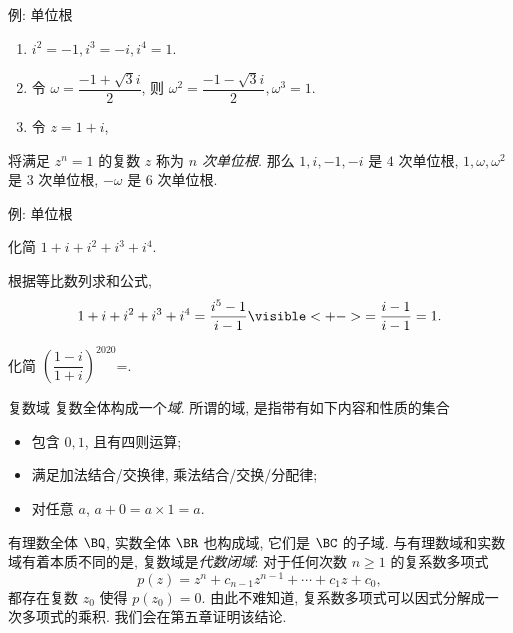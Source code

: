 \begin{frame}{例: 单位根}
	\onslide<+->
	\begin{example}
		\begin{enumerate}
			\item $i^2=-1,i^3=-i,i^4=1$.
			\onslide<+->{%
				一般地, 对于整数 $n$, 
				\[i^{4n}=1,\quad i^{4n+1}=i,\quad i^{4n+2}=-1,\quad i^{4n+3}=-i.\]
			}
			\vspace{-\baselineskip}
			\item 令 $\omega=\dfrac{-1+\sqrt 3i}2$, 则 $\omega^2=\dfrac{-1-\sqrt3i}2,\omega^3=1$.
			\item 令 $z=1+i$, \onslide<+->{则
			\[z^2=2i,\quad z^3=-2+2i,\quad z^4=-4,\quad z^8=16=2^4.\]}
		\end{enumerate}
		\vspace{-\baselineskip}
	\end{example}
	\onslide<+->
	将满足 $z^n=1$ 的复数 $z$ 称为 \emph{$n$ 次单位根}.
	\onslide<+->
	那么 $1,i,-1,-i$ 是 $4$ 次单位根, $1,\omega,\omega^2$ 是 $3$ 次单位根, $-\omega$ 是 $6$ 次单位根.
\end{frame}


\begin{frame}{例: 单位根}
	\onslide<+->
	\begin{example}
		化简 $1+i+i^2+i^3+i^4$.
	\end{example}
	\onslide<+->
	\begin{solution}
		根据等比数列求和公式,
		\[1+i+i^2+i^3+i^4=\frac{i^5-1}{i-1}
		\visible<+->{=\frac{i-1}{i-1}=1.}\]
	\end{solution}
	\onslide<+->
	\begin{exercise}
		化简 $\left(\dfrac{1-i}{1+i}\right)^{2020}$=\fillblankframe{$1$}.
	\end{exercise}
\end{frame}


\begin{frame}{复数域\noexer}
	\onslide<+->
	复数全体构成一个\emph{域}.
	\onslide<+->
	所谓的域, 是指带有如下内容和性质的集合
	\begin{itemize}\bf
		\item 包含 $0,1$, 且有四则运算;
		\item 满足加法结合/交换律, 乘法结合/交换/分配律;
		\item 对任意 $a$, $a+0=a\times 1=a$.
	\end{itemize}
	\onslide<+->
	有理数全体 $\BQ$, 实数全体 $\BR$ 也构成域, 它们是 $\BC$ 的子域.
	\onslide<+->
	与有理数域和实数域有着本质不同的是, 复数域是\emph{代数闭域}:
	\onslide<+->
	对于任何次数 $n\ge 1$ 的复系数多项式
		\[p(z)=z^n+c_{n-1}z^{n-1}+\cdots+c_1z+c_0,\]
	都存在复数 $z_0$ 使得 $p(z_0)=0$.
	\onslide<+->
	由此不难知道, 复系数多项式可以因式分解成一次多项式的乘积.
	\onslide<+->
	我们会在第五章证明该结论.
\end{frame}


